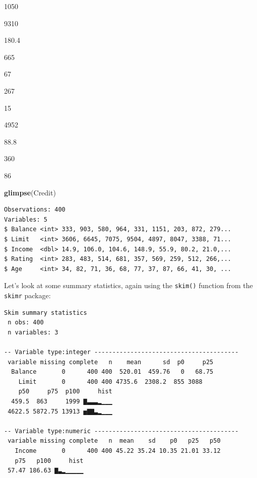 \documentclass[12pt,]{krantz}
\makeatletter
\newenvironment{Shaded}{\begin{snugshade}}{\end{snugshade}}
\newcommand{\KeywordTok}[1]{\textcolor[rgb]{0.27,0.27,0.27}{\textbf{#1}}}
\newcommand{\StringTok}[1]{\textcolor[rgb]{0.5,0.5,0.5}{#1}}
\newcommand{\OperatorTok}[1]{\textcolor[rgb]{0.43,0.43,0.43}{\textbf{#1}}}
\newcommand{\NormalTok}[1]{#1}
\newenvironment{kframe}{%
\medskip{}
\setlength{\fboxsep}{.8em}
 \def\at@end@of@kframe{}%
 \ifinner\ifhmode%
  \def\at@end@of@kframe{\end{minipage}}%
  \begin{minipage}{\columnwidth}%
 \fi\fi%
 \def\FrameCommand##1{\hskip\@totalleftmargin \hskip-\fboxsep
 \colorbox{shadecolor}{##1}\hskip-\fboxsep
     \hskip-\linewidth \hskip-\@totalleftmargin \hskip\columnwidth}%
 \MakeFramed {\advance\hsize-\width
   \@totalleftmargin\z@ \linewidth\hsize
   \@setminipage}}%
 {\par\unskip\endMakeFramed%
 \at@end@of@kframe}
\renewenvironment{Shaded}{\begin{kframe}}{\end{kframe}}
\makeatother
\begin{document}
1050

9310

180.4

665

67

267

15

4952

88.8

360

86

\begin{Shaded}
\begin{Highlighting}[]
\KeywordTok{glimpse}\NormalTok{(Credit)}
\end{Highlighting}
\end{Shaded}

\begin{verbatim}
Observations: 400
Variables: 5
$ Balance <int> 333, 903, 580, 964, 331, 1151, 203, 872, 279...
$ Limit   <int> 3606, 6645, 7075, 9504, 4897, 8047, 3388, 71...
$ Income  <dbl> 14.9, 106.0, 104.6, 148.9, 55.9, 80.2, 21.0,...
$ Rating  <int> 283, 483, 514, 681, 357, 569, 259, 512, 266,...
$ Age     <int> 34, 82, 71, 36, 68, 77, 37, 87, 66, 41, 30, ...
\end{verbatim}

Let's look at some summary statistics, again using the \texttt{skim()}
function from the \texttt{skimr} package:

\begin{Shaded}
\end{Shaded}

\begin{verbatim}
Skim summary statistics
 n obs: 400 
 n variables: 3 

-- Variable type:integer ----------------------------------------
 variable missing complete   n    mean      sd  p0     p25
  Balance       0      400 400  520.01  459.76   0   68.75
    Limit       0      400 400 4735.6  2308.2  855 3088   
    p50     p75  p100     hist
  459.5  863     1999 ▇▃▃▃▂▁▁▁
 4622.5 5872.75 13913 ▅▇▇▃▂▁▁▁

-- Variable type:numeric ----------------------------------------
 variable missing complete   n  mean    sd    p0   p25   p50
   Income       0      400 400 45.22 35.24 10.35 21.01 33.12
   p75   p100     hist
 57.47 186.63 ▇▃▂▁▁▁▁▁
\end{verbatim}
\end{document}
